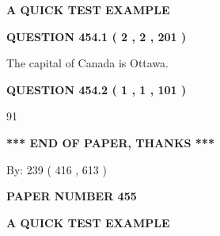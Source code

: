 \documentclass[12pt]{article}
\begin{document}
   
 \vspace{0.2in}
{\LARGE {\textbf{ A QUICK TEST EXAMPLE}}}
   
   
  
\vspace{0.2in}
  
{\textbf{\Large{QUESTION
454.1 
 ( 2 , 2 , 201 )
}}}
  
  
 
 
\noindent{}
 
 
The capital of Canada is Ottawa.
 
 
 
 
  
\vspace{0.2in}
  
{\textbf{\Large{QUESTION
454.2 
 ( 1 , 1 , 101 )
}}}
  
  
 
 
\noindent{}

91
 
 
   
   
 \vspace{0.2in}
 
   
   
   
   
\vspace{1.0in} 
{\textbf{\large{ *** END OF PAPER, THANKS *** }}} 
   
   
\hspace{1.0in} By: 
 239 ( 416 ,  613 )
   
   
   
   
\newpage 
\setcounter{page}{ 
   455001 } 
   
   
   
   
 {\textbf{ \Large{ PAPER NUMBER  455  }}}
   
   
\vspace{0.2in}
   
   
   
   
   
   
 \vspace{0.2in}
{\LARGE {\textbf{ A QUICK TEST EXAMPLE}}}
   
   
  
\vspace{0.2in}
  
\end{document}
